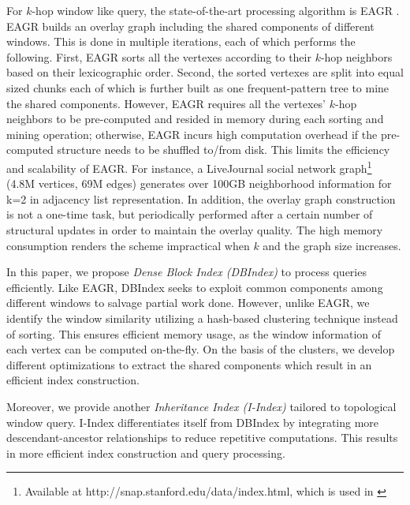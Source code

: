 For $k$-hop window like query, the state-of-the-art processing algorithm
is EAGR \cite{mondal2014eagr}. EAGR builds an overlay graph including 
the shared components of different windows. This is done 
in multiple iterations, each of which performs the following.
First, EAGR sorts all the vertexes according to their $k$-hop 
neighbors based on their lexicographic order. 
Second, the sorted vertexes are split into equal sized chunks each of which is further built as one frequent-pattern tree to mine the shared components. 
However, EAGR requires all the vertexes' $k$-hop 
neighbors to be pre-computed and resided in memory during 
each sorting and mining operation;
otherwise, EAGR incurs high computation overhead if the pre-computed structure needs to be shuffled to/from disk.
This limits the efficiency and scalability of EAGR.
 For instance, 
a LiveJournal social network graph\footnote{Available at http://snap.stanford.edu/data/index.html, which is used in \cite{mondal2014eagr}} 
(4.8M vertices, 69M edges) generates over 100GB neighborhood information 
for k=2 in adjacency list representation. In addition, the overlay graph construction is not a one-time task,
but periodically performed after a certain number of structural updates in order to maintain the overlay quality. The high memory consumption renders the scheme impractical 
when $k$ and the graph size increases.

In this paper,
we propose \textit{Dense Block Index (DBIndex)} 
to process queries efficiently.
Like EAGR, DBIndex seeks to exploit common
components among different windows to salvage 
partial work done. However, unlike EAGR,
we identify the window similarity utilizing a hash-based 
clustering technique instead of sorting. This ensures 
efficient memory usage, as the window information of each vertex can 
be computed on-the-fly. On the basis of the clusters, we develop different optimizations 
to extract the shared components which result in an efficient index construction. 

Moreover, we provide another \emph{Inheritance Index (I-Index)} tailored 
to topological window query. I-Index differentiates itself from
DBIndex by integrating more descendant-ancestor relationships 
to reduce repetitive computations. This results in
more efficient index construction and query processing.  

